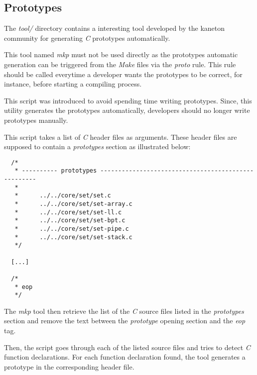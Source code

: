 %
%
%
%
%
%

%
%

\subsection{Prototypes}
\label{section:prototypes}

The \textit{tool/} directory contains a interesting tool developed by
the kaneton community for generating \textit{C} prototypes automatically.

This tool named \textit{mkp} must not be used directly as the prototypes
automatic generation can be triggered from the \textit{Make} files via the
\textit{proto} rule. This rule should be called everytime a developer wants
the prototypes to be correct, for instance, before starting a compiling
process.

This script was introduced to avoid spending time writing prototypes.
Since, this utility generates the prototypes automatically, developers
should no longer write prototypes manually.

This script takes a list of \textit{C} header files as arguments. These header
files are supposed to contain a \textit{prototypes} section as illustrated
below:

\begin{verbatim}
  /*
   * ---------- prototypes ----------------------------------------------------
   *
   *      ../../core/set/set.c
   *      ../../core/set/set-array.c
   *      ../../core/set/set-ll.c
   *      ../../core/set/set-bpt.c
   *      ../../core/set/set-pipe.c
   *      ../../core/set/set-stack.c
   */

  [...]

  /*
   * eop
   */
\end{verbatim}

The \textit{mkp} tool then retrieve the list of the \textit{C} source files
listed in the \textit{prototypes} section and remove the text between
the \textit{prototype} opening section and the \textit{eop} tag.

Then, the script goes through each of the listed source files and tries to
detect \textit{C} function declarations. For each function declaration found,
the tool generates a prototype in the corresponding header file.

